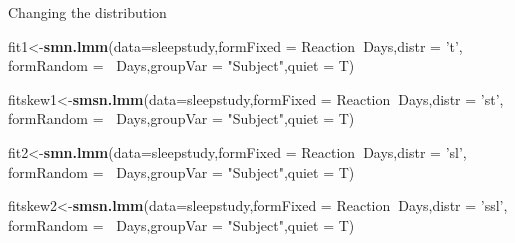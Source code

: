 \documentclass[
  ignorenonframetext,
]{beamer}
\newenvironment{Shaded}{\begin{snugshade}}{\end{snugshade}}
\newcommand{\DataTypeTok}[1]{\textcolor[rgb]{0.13,0.29,0.53}{#1}}
\newcommand{\KeywordTok}[1]{\textcolor[rgb]{0.13,0.29,0.53}{\textbf{#1}}}
\newcommand{\NormalTok}[1]{#1}
\newcommand{\OperatorTok}[1]{\textcolor[rgb]{0.81,0.36,0.00}{\textbf{#1}}}
\newcommand{\StringTok}[1]{\textcolor[rgb]{0.31,0.60,0.02}{#1}}
\begin{document}
\begin{frame}[fragile]{Changing the distribution}
\protect\hypertarget{changing-the-distribution}{}

\scriptsize

\begin{Shaded}
\begin{Highlighting}[]
\NormalTok{fit1<-}\KeywordTok{smn.lmm}\NormalTok{(}\DataTypeTok{data=}\NormalTok{sleepstudy,}\DataTypeTok{formFixed =}\NormalTok{ Reaction}\OperatorTok{~}\NormalTok{Days,}\DataTypeTok{distr =} \StringTok{'t'}\NormalTok{,}
              \DataTypeTok{formRandom =} \OperatorTok{~}\NormalTok{Days,}\DataTypeTok{groupVar =} \StringTok{"Subject"}\NormalTok{,}\DataTypeTok{quiet =}\NormalTok{ T)}
\end{Highlighting}
\end{Shaded}

\begin{Shaded}
\begin{Highlighting}[]
\NormalTok{fitskew1<-}\KeywordTok{smsn.lmm}\NormalTok{(}\DataTypeTok{data=}\NormalTok{sleepstudy,}\DataTypeTok{formFixed =}\NormalTok{ Reaction}\OperatorTok{~}\NormalTok{Days,}\DataTypeTok{distr =} \StringTok{'st'}\NormalTok{,}
                  \DataTypeTok{formRandom =} \OperatorTok{~}\NormalTok{Days,}\DataTypeTok{groupVar =} \StringTok{"Subject"}\NormalTok{,}\DataTypeTok{quiet =}\NormalTok{ T)}
\end{Highlighting}
\end{Shaded}

\begin{Shaded}
\begin{Highlighting}[]
\NormalTok{fit2<-}\KeywordTok{smn.lmm}\NormalTok{(}\DataTypeTok{data=}\NormalTok{sleepstudy,}\DataTypeTok{formFixed =}\NormalTok{ Reaction}\OperatorTok{~}\NormalTok{Days,}\DataTypeTok{distr =} \StringTok{'sl'}\NormalTok{,}
              \DataTypeTok{formRandom =} \OperatorTok{~}\NormalTok{Days,}\DataTypeTok{groupVar =} \StringTok{"Subject"}\NormalTok{,}\DataTypeTok{quiet =}\NormalTok{ T)}
\end{Highlighting}
\end{Shaded}

\begin{Shaded}
\begin{Highlighting}[]
\NormalTok{fitskew2<-}\KeywordTok{smsn.lmm}\NormalTok{(}\DataTypeTok{data=}\NormalTok{sleepstudy,}\DataTypeTok{formFixed =}\NormalTok{ Reaction}\OperatorTok{~}\NormalTok{Days,}\DataTypeTok{distr =} \StringTok{'ssl'}\NormalTok{,}
                  \DataTypeTok{formRandom =} \OperatorTok{~}\NormalTok{Days,}\DataTypeTok{groupVar =} \StringTok{"Subject"}\NormalTok{,}\DataTypeTok{quiet =}\NormalTok{ T)}
\end{Highlighting}
\end{Shaded}


\end{frame}
\end{document}
